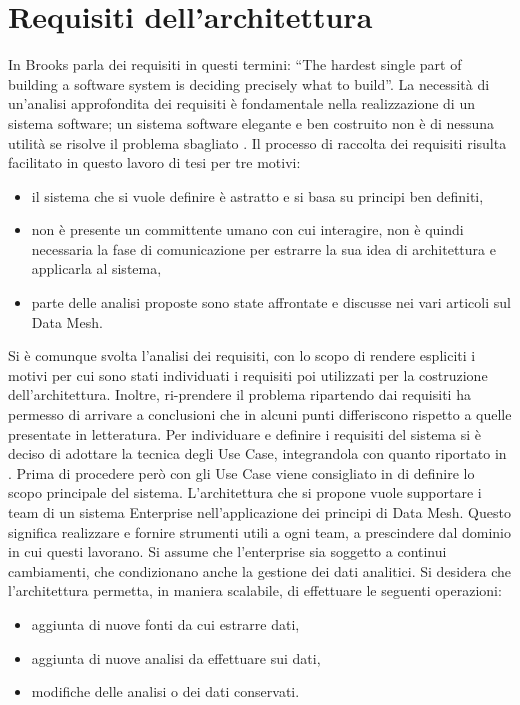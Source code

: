 \documentclass[12pt]{report}
\begin{document}
\section{Requisiti dell'architettura}\label{requisiti}
In \cite{brooks_no_1987} Brooks parla dei requisiti in questi termini: ``The hardest single part of building a software system is deciding precisely what to build''. 
La necessità di un'analisi approfondita dei requisiti è fondamentale nella realizzazione di un sistema software; un sistema software elegante e ben costruito non è di nessuna utilità se risolve il problema sbagliato \cite{pressman2005software}.
Il processo di raccolta dei requisiti risulta facilitato in questo lavoro di tesi per tre motivi:
\begin{itemize}
    \item il sistema che si vuole definire è astratto e si basa su principi ben definiti,
    \item non è presente un committente umano con cui interagire, non è quindi necessaria la fase di comunicazione per estrarre la sua idea di architettura e applicarla al sistema,
    \item parte delle analisi proposte sono state affrontate e discusse nei vari articoli sul Data Mesh.
\end{itemize}
Si è comunque svolta l'analisi dei requisiti, con lo scopo di rendere espliciti i motivi per cui sono stati individuati i requisiti poi utilizzati per la costruzione dell'architettura.
Inoltre, ri-prendere il problema ripartendo dai requisiti ha permesso di arrivare a conclusioni che in alcuni punti differiscono rispetto a quelle presentate in letteratura.
Per individuare e definire i requisiti del sistema si è deciso di adottare la tecnica degli Use Case, integrandola con quanto riportato in \cite{dehghani_data_2022}.
Prima di procedere però con gli Use Case viene consigliato in \cite{cockburn2008writing} di definire lo scopo principale del sistema.
L'architettura che si propone vuole supportare i team di un  sistema Enterprise nell'applicazione dei principi di Data Mesh. 
Questo significa realizzare e fornire strumenti utili a ogni team, a prescindere dal dominio in cui questi lavorano.
Si assume che l'enterprise sia soggetto a continui cambiamenti, che condizionano anche la gestione dei dati analitici. 
Si desidera che l'architettura permetta, in maniera scalabile, di effettuare le seguenti operazioni:
\begin{itemize}
    \item aggiunta di nuove fonti da cui estrarre dati,
    \item aggiunta di nuove analisi da effettuare sui dati,
    \item modifiche delle analisi o dei dati conservati.
\end{itemize}
\end{document}

